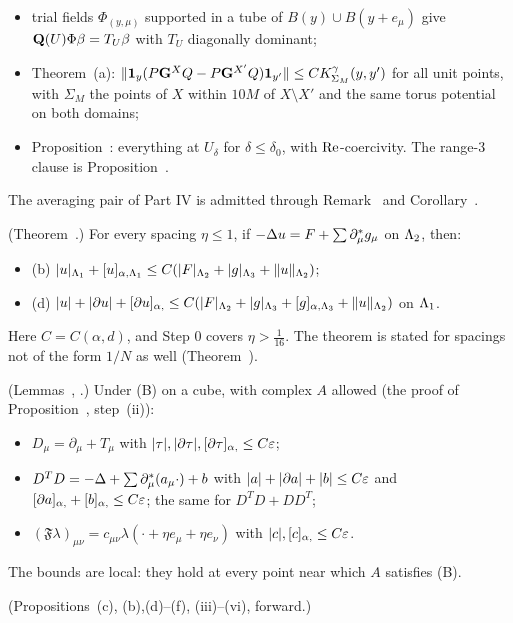 \begin{description}[style=unboxed,leftmargin=0.8em]
\begin{itemize}
  \item trial fields $\Phi_{(y,\mu)}$ supported in a tube of $B(y)\cup B(y+e_\mu)$ give $\mathbf Q(U)\Phi\beta=T_U\beta$ with $T_U$ diagonally dominant;
  \item Theorem~(a): $\|\mathbf 1_y(P\mathbf G^XQ-P\mathbf G^{X'}Q)\mathbf 1_{y'}\|\le CK^\gamma_{\Sigma_M}(y,y')$ for all unit points, with $\Sigma_M$ the points of $X$ within $10M$ of $X\setminus X'$ and the same torus potential on both domains;
  \item Proposition~: everything at $U_\delta$ for $\delta\le\delta_0$, with $\operatorname{Re}$-coercivity. The range-3 clause is Proposition~.
  \end{itemize}
  The averaging pair of Part IV is admitted through Remark~ and Corollary~.
\item[I7. Flat interior regularity] (Theorem~.) For every spacing $\eta\le1$, if $-\Delta u=F+\sum\partial^*_\mu g_\mu$ on $\Lambda_2$, then:
  \begin{itemize}
  \item (b) $|u|_{\Lambda_1}+[u]_{\alpha,\Lambda_1}\le C(|F|_{\Lambda_2}+|g|_{\Lambda_3}+\|u\|_{\Lambda_2})$;
  \item (d) $|u|+|\partial u|+[\partial u]_{\alpha,}\le C(|F|_{\Lambda_2}+|g|_{\Lambda_3}+[g]_{\alpha,\Lambda_3}+\|u\|_{\Lambda_2})$ on $\Lambda_1$.
  \end{itemize}
  Here $C=C(\alpha,d)$, and Step 0 covers $\eta>\frac1{16}$. The theorem is stated for spacings not of the form $1/N$ as well (Theorem~).
\item[I8. Local expansions] (Lemmas~, .) Under (B) on a cube, with complex $A$ allowed (the proof of Proposition~, step~(ii)):
  \begin{itemize}
  \item $D_\mu=\partial_\mu+T_\mu$ with $|\tau|,|\partial\tau|,[\partial\tau]_{\alpha,}\le C\varepsilon$;
  \item $D^TD=-\Delta+\sum\partial^*_\mu(a_\mu\cdot)+b$ with $|a|+|\partial a|+|b|\le C\varepsilon$ and $[\partial a]_{\alpha,}+[b]_{\alpha,}\le C\varepsilon$; the same for $D^TD+DD^T$;
  \item $(\mathfrak F\lambda)_{\mu\nu}=c_{\mu\nu}\lambda(\cdot+\eta e_\mu+\eta e_\nu)$ with $|c|,[c]_{\alpha,}\le C\varepsilon$.
  \end{itemize}
  The bounds are local: they hold at every point near which $A$ satisfies (B).
\item[I9. Averages] (Propositions~(c), (b),(d)--(f), (iii)--(vi), forward.)

\end{description}
